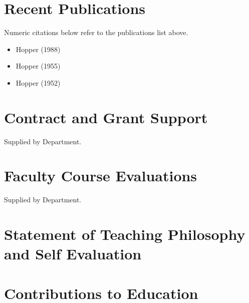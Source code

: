 \documentclass[11pt]{report}
\begin{document}
\begin{internalonly}
\chapter{Recent Publications}

Numeric citations below refer to the {\sc publications list} above.
\begin{itemize}
  \item \cite{hopper_compiling_1988} Hopper (1988)
  \item \cite{hopper_automatic_1955} Hopper (1955)
  \item \cite{hopper_education_1952} Hopper (1952)
\end{itemize}
  
\chapter{Contract and Grant Support}
Supplied by Department.

\chapter{Faculty Course Evaluations}
Supplied by Department.

\chapter{Statement of Teaching Philosophy and Self Evaluation}

\lipsum[1-2]

\end{internalonly}

\chapter{Contributions to Education}
\end{document}
